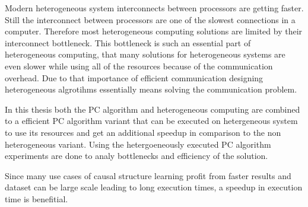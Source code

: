 Modern heterogeneous system interconnects between processors are getting faster. Still the interconnect between processors are one of the slowest connections in a computer. Therefore most heterogeneous computing solutions are limited by their interconnect bottleneck. This bottleneck is such an essential part of heterogeneous computing, that many solutions for heterogeneous systems are even slower while using all of the resources because of the communication overhead. Due to that importance of efficient communication designing heterogeneous algrotihms essentially means solving the communication problem.

In this thesis both the PC algorithm and heterogeneous computing are combined to a efficient PC algorithm variant that can be executed on hetergeneous system to use its resources and get an additional speedup in comparison to the non heterogeneous variant. Using the hetergoeneously executed PC algorithm experiments are done to analy bottlenecks and efficiency of the solution.

Since many use cases of causal structure learning profit from faster results and dataset can be large scale leading to long execution times, a speedup in execution time is benefitial.


\cite{esmaeilzadehDarkSiliconEnd2011}



